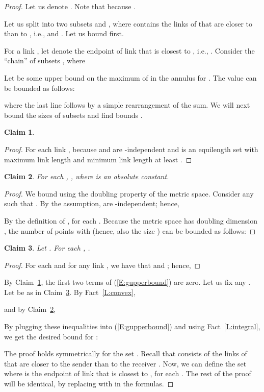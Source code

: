 \documentclass[11pt]{article}
\newtheorem{claim}{Claim}
\begin{document}
\begin{proof}
Let us denote .  Note that  because . 

 Let us split  into two subsets  and , where  contains the links of  that are closer to  than to ,
i.e.,  and . Let us bound  first.

For a link , let  denote the endpoint of link  that is closest to , i.e., . 
Consider the ``chain'' of subsets , where 
 
Let  be some upper bound on the maximum of  in the annulus  for . The value  can be bounded as follows:
 
 where the last line follows by a simple rearrangement of the sum. We will next bound the sizes of subsets  and find bounds . 
 \begin{claim}\label{C:gs1}
 
 \end{claim}
 \begin{proof}
For each link ,  because  and  are -independent and  is an equilength set with maximum link length  and minimum link length at least . 
 \end{proof}
 \begin{claim}\label{C:gs2}
 For each , , where  is an absolute constant.
 \end{claim}
 \begin{proof}
 We bound  using the doubling property of the metric space. Consider any  such that . By the assumption,  are  -independent; hence,
 
 By the definition of ,  for each . Because the metric space has doubling dimension , the number of points  with  (hence, also the size ) can be bounded as follows: 

 \end{proof}
\begin{claim}\label{C:gmr}
Let . For each , .
\end{claim}
\begin{proof}
For each  and for any link , we have that  and ; hence, 

\end{proof}
By Claim~\ref{C:gs1}, the first two terms of (\ref{E:gupperbound}) are zero. 
Let us fix any . Let  be as in Claim~\ref{C:gmr}. By Fact~\ref{L:convex}, 

and by Claim~\ref{C:gs2},

 By plugging these inequalities into (\ref{E:gupperbound}) and using Fact~\ref{L:integral}, we get the desired bound for :

The proof holds symmetrically for the set . Recall that  consists of the links of  that are closer to the sender  than to the receiver . Now, we can define the set  where  is the endpoint of link  that is closest to , for each . The rest of the proof will be identical, by replacing  with  in the formulas.
\end{proof}
\end{document}
